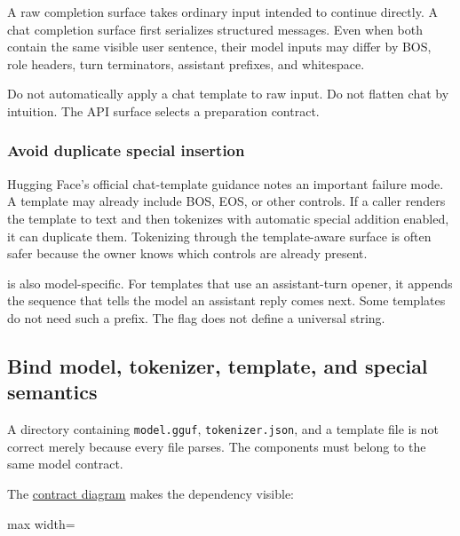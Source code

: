 \documentclass[
  10pt,
]{article}
\begin{document}
A raw completion surface takes ordinary input intended to continue
directly. A chat completion surface first serializes structured
messages. Even when both contain the same visible user sentence, their
model inputs may differ by BOS, role headers, turn terminators,
assistant prefixes, and whitespace.

Do not automatically apply a chat template to raw input. Do not flatten
chat by intuition. The API surface selects a preparation contract.

\subsubsection{Avoid duplicate special
insertion}\label{avoid-duplicate-special-insertion}

Hugging Face's official chat-template guidance notes an important
failure mode. A template may already include BOS, EOS, or other
controls. If a caller renders the template to text and then tokenizes
with automatic special addition enabled, it can duplicate them.
Tokenizing through the template-aware surface is often safer because the
owner knows which controls are already present.

\texttt{} is also model-specific. For
templates that use an assistant-turn opener, it appends the sequence
that tells the model an assistant reply comes next. Some templates do
not need such a prefix. The flag does not define a universal string.

\subsection{Bind model, tokenizer, template, and special
semantics}\label{bind-model-tokenizer-template-and-special-semantics}

A directory containing \texttt{model.gguf}, \texttt{tokenizer.json}, and
a template file is not correct merely because every file parses. The
components must belong to the same model contract.

The
\href{https://github.com/hermonai/inside-the-llm-engine/blob/astra-visual-rewrite/diagrams/tokenizer/model-tokenizer-template-contract.txt}{contract
diagram} makes the dependency visible:

\begin{center}\begin{adjustbox}{max width=\linewidth}\end{adjustbox}\end{center}
\end{document}
